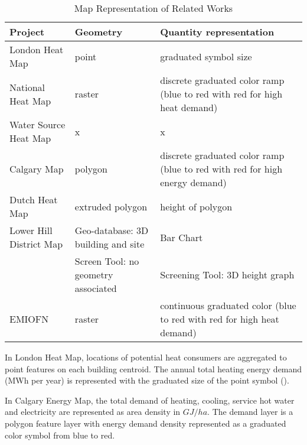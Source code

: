 \begin{table}[h!]
\centering
\caption{Map Representation of Related Works}
\label{tab:mapRep}
\begin{tabular}{p{4cm}|p{4cm}|p{4cm}}
  \hline
  Project                 & Geometry                            & Quantity representation         \\
  \hline
  \hline
  London Heat Map         & point                               & graduated symbol size           \\
  \hline
  National Heat Map       & raster                              & discrete graduated color ramp (blue to red with red for high heat demand) \\
  \hline
  Water Source Heat Map   & x                                   & x                               \\
  \hline
  Calgary Map             & polygon                             & discrete graduated color ramp  (blue to red with red for high energy demand) \\
  \hline
  Dutch Heat Map          & extruded polygon                    & height of polygon               \\
  \hline
  Lower Hill District Map & Geo-database: 3D building and site  & Bar Chart                       \\
  \cline{2-3}
                          & Screen Tool: no geometry associated & Screening Tool: 3D height graph \\
  \hline
  EMIOFN                  & raster                              & continuous graduated color (blue to red with red for high heat demand) \\
  \hline
\end{tabular}
\end{table}

In London Heat Map, locations of potential heat consumers are
aggregated to point features on each building centroid. The annual
total heating energy demand (MWh per year) is represented with the
graduated size of the point symbol ().

In Calgary Energy Map, the total demand of heating, cooling, service
hot water and electricity are represented as area density in
$GJ/ha$. The demand layer is a polygon feature layer with energy
demand density represented as a graduated color symbol from blue to
red.

